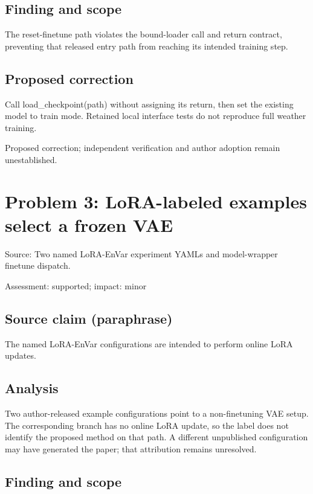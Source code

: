 \documentclass[11pt]{article}
\begin{document}
\subsection*{Finding and scope}

The reset-finetune path violates the bound-loader call and return contract, preventing that released entry path from reaching its intended training step.

\subsection*{Proposed correction}

Call load\_checkpoint(path) without assigning its return, then set the existing model to train mode. Retained local interface tests do not reproduce full weather training.

Proposed correction; independent verification and author adoption remain unestablished.

\section*{Problem 3: LoRA-labeled examples select a frozen VAE}

Source: Two named LoRA-EnVar experiment YAMLs and model-wrapper finetune dispatch.

Assessment: supported; impact: minor

\subsection*{Source claim (paraphrase)}

The named LoRA-EnVar configurations are intended to perform online LoRA updates.

\subsection*{Analysis}

Two author-released example configurations point to a non-finetuning VAE setup. The corresponding branch has no online LoRA update, so the label does not identify the proposed method on that path. A different unpublished configuration may have generated the paper; that attribution remains unresolved.

\subsection*{Finding and scope}
\end{document}
